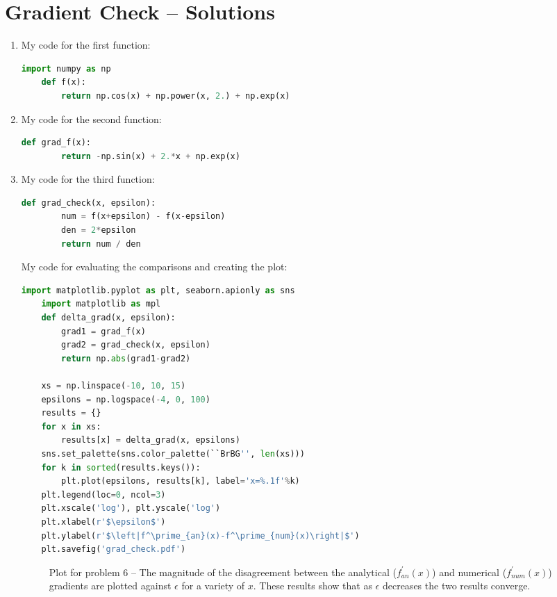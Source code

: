 \documentclass[submit]{harvardml}
\begin{document}
\section*{Gradient Check -- Solutions}
\begin{enumerate}
\item
  My code for the first function:
  \begin{lstlisting}[language=Python]
    import numpy as np
    def f(x):
        return np.cos(x) + np.power(x, 2.) + np.exp(x)
  \end{lstlisting}
\item
  My code for the second function:
  \begin{lstlisting}[language=Python]
    def grad_f(x):
        return -np.sin(x) + 2.*x + np.exp(x)
    \end{lstlisting}
\item
  My code for the third function:
  \begin{lstlisting}[language=Python]
    def grad_check(x, epsilon):
        num = f(x+epsilon) - f(x-epsilon)
        den = 2*epsilon
        return num / den
  \end{lstlisting}

  My code for evaluating the comparisons and creating the plot:
  \begin{lstlisting}[language=Python]
    import matplotlib.pyplot as plt, seaborn.apionly as sns
    import matplotlib as mpl 
    def delta_grad(x, epsilon):
        grad1 = grad_f(x)
        grad2 = grad_check(x, epsilon)
        return np.abs(grad1-grad2)

    xs = np.linspace(-10, 10, 15)
    epsilons = np.logspace(-4, 0, 100)
    results = {}
    for x in xs:
        results[x] = delta_grad(x, epsilons)
    sns.set_palette(sns.color_palette(``BrBG'', len(xs)))
    for k in sorted(results.keys()):
        plt.plot(epsilons, results[k], label='x=%.1f'%k)
    plt.legend(loc=0, ncol=3)
    plt.xscale('log'), plt.yscale('log')
    plt.xlabel(r'$\epsilon$')
    plt.ylabel(r'$\left|f^\prime_{an}(x)-f^\prime_{num}(x)\right|$')
    plt.savefig('grad_check.pdf')
  \end{lstlisting}

  \begin{figure*}
    \caption{Plot for problem 6 -- The magnitude of the disagreement
      between the analytical ($f^\prime_{an}(x)$) and numerical
      ($f^\prime_{num}(x)$) gradients are plotted against $\epsilon$
      for a variety of $x$. These results show that as $\epsilon$ decreases the two results converge.}
  \end{figure*}
\end{enumerate}
\end{document}
